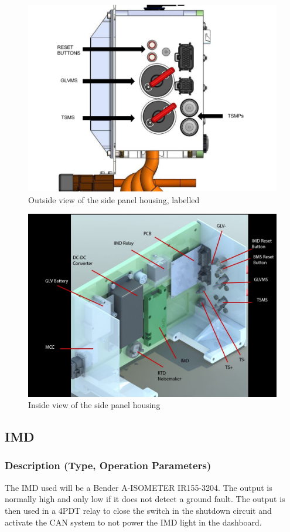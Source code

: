 \documentclass{article}
\begin{document}
            \begin{figure}[H]
                \centering
                \includegraphics[width = 0.6 \textwidth]{MCHousingdiagram}
                \caption{Outside view of the side panel housing, labelled}
                \label{cpanel1}
            \end{figure}

            \begin{figure}[H]
                \centering
                \includegraphics[width = 0.6 \textwidth]{MCHousinginside}
                \caption{Inside view of the side panel housing}
                \label{cpanel2}
            \end{figure}

    \subsection{IMD}

        \subsubsection{Description (Type, Operation Parameters)}

            The IMD used will be a Bender A-ISOMETER IR155-3204. The output is normally high and only low if it does not detect a ground fault. The output is then used in a 4PDT relay to close the switch in the shutdown circuit and activate the CAN system to not power the IMD light in the dashboard.
\end{document}
